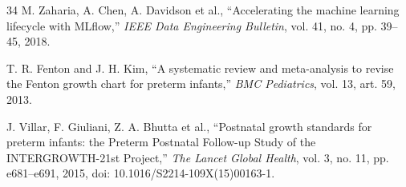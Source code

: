 \begin{thebibliography}{34}
M. Zaharia, A. Chen, A. Davidson et al., ``Accelerating the machine learning lifecycle with MLflow,'' \emph{IEEE Data Engineering Bulletin}, vol. 41, no. 4, pp. 39--45, 2018.

T. R. Fenton and J. H. Kim, ``A systematic review and meta-analysis to revise the Fenton growth chart for preterm infants,'' \emph{BMC Pediatrics}, vol. 13, art. 59, 2013.

J. Villar, F. Giuliani, Z. A. Bhutta et al., ``Postnatal growth standards for preterm infants: the Preterm Postnatal Follow-up Study of the INTERGROWTH-21st Project,'' \emph{The Lancet Global Health}, vol. 3, no. 11, pp. e681--e691, 2015, doi: 10.1016/S2214-109X(15)00163-1.

\end{thebibliography}
